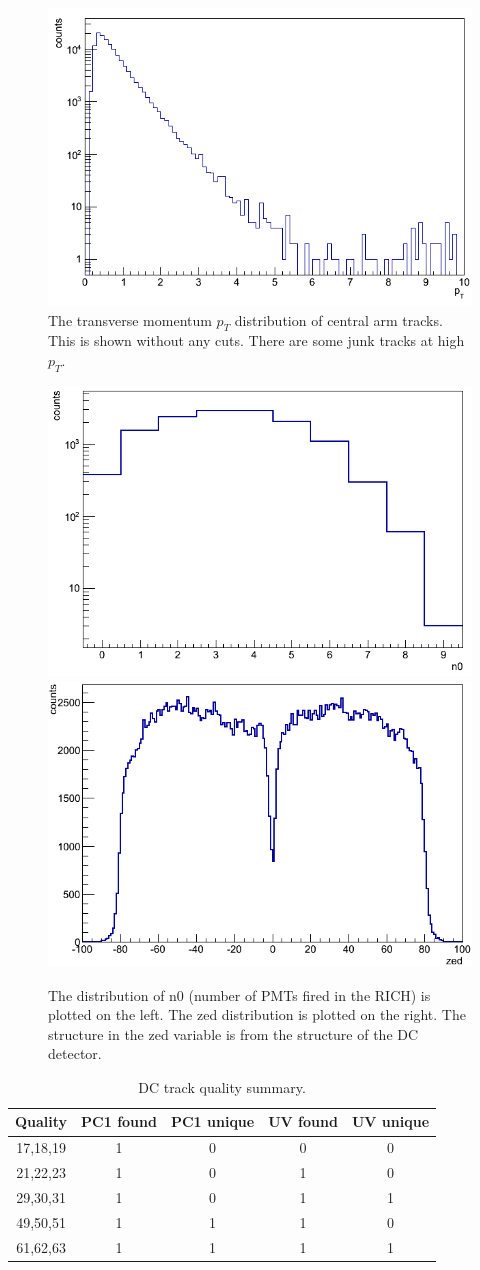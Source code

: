 \begin{figure}[!h]
\begin{center}
\includegraphics[width=0.45\linewidth]{figs/cnt_pt_dist.png}
\caption{The transverse momentum $p_{T}$ distribution of central arm tracks. This is shown without any cuts. There are some junk tracks at high $p_T$.}
\label{fig:dc_mom_dist_T}
\end{center}
\end{figure}
\begin{figure}[!h]
\begin{center}
\includegraphics[width=0.45\linewidth]{figs/n0_dist.png}
\includegraphics[width=0.45\linewidth]{figs/zed_dist.png}
\caption{The distribution of n0 (number of PMTs fired in the RICH) is plotted on the left. The zed distribution is plotted on the right. The structure in the zed variable is from the structure of the DC detector.}
\label{fig:n0_and_zed}
\end{center}
\end{figure}

\begin{table}[h!]
\caption{DC track quality summary.}
\begin{center}
    \begin{tabular}{ccccc}
    \hline
    Quality & PC1 found  & PC1 unique & UV found & UV unique\\ \hline
    17,18,19 & 1 & 0 & 0 & 0\\ \hline
    21,22,23 & 1 & 0 & 1 & 0\\ \hline
    29,30,31 & 1 & 0 & 1 & 1\\ \hline
    49,50,51 & 1 & 1 & 1 & 0\\ \hline
    61,62,63 & 1 & 1 & 1 & 1\\ \hline
    \end{tabular}
\end{center}
\end{table}

